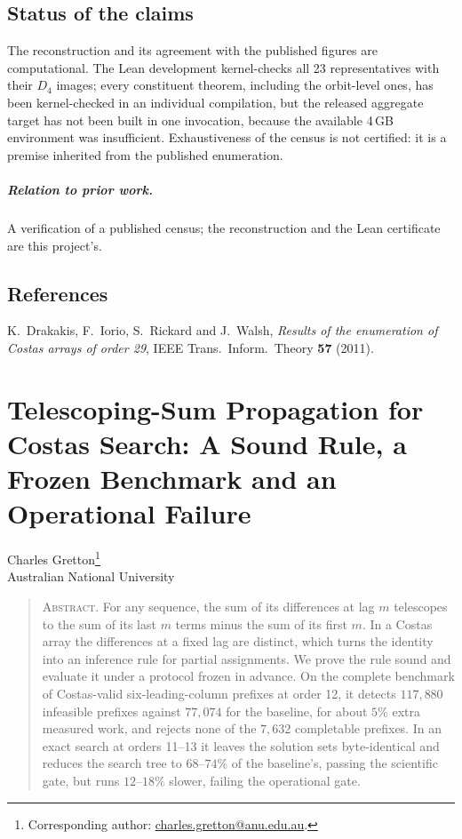\documentclass[11pt,a4paper,oneside]{report}
\makeatletter
\theoremstyle{definition}
\newcommand{\paperauthor}{\begin{center}\large Charles Gretton\footnote{Corresponding author: \href{mailto:charles.gretton@anu.edu.au}{charles.gretton@anu.edu.au}.}\\[2pt]\normalsize Australian National University\end{center}\vspace{0.5em}}
\newcommand{\paperabstract}[1]{\begin{quote}\small\noindent\textsc{Abstract.} #1\end{quote}\vspace{0.5em}}
\newenvironment{paperrefs}{\section*{References}\list{\@biblabel{\@arabic\c@enumiv}}{\settowidth\labelwidth{\@biblabel{99}}\leftmargin\labelwidth\advance\leftmargin\labelsep\usecounter{enumiv}\let\p@enumiv\@empty\renewcommand\theenumiv{\@arabic\c@enumiv}}\sloppy\small}{\endlist}
\makeatother
\begin{document}

\section{Status of the claims}\label{p4-sec:status}
The reconstruction and its agreement with the published figures are computational. The Lean
development kernel-checks all 23 representatives with their $D_4$ images; every constituent theorem, including the orbit-level ones, has been kernel-checked in an individual compilation, but the released aggregate target has not been built in one invocation, because the available 4\,GB environment was insufficient. Exhaustiveness of the census is not certified: it is a premise
inherited from the published enumeration.

\paragraph{Relation to prior work.} A verification of a published census; the reconstruction and the Lean certificate are this project's.
\begin{paperrefs}
 K.~Drakakis, F.~Iorio, S.~Rickard and J.~Walsh,
\emph{Results of the enumeration of Costas arrays of order 29}, IEEE Trans.\
Inform.\ Theory \textbf{57} (2011).
\end{paperrefs}

\clearpage
\chapter{Telescoping-Sum Propagation for Costas Search: A Sound Rule, a Frozen Benchmark and an Operational Failure}\label{p5-paper}
\paperauthor
\paperabstract{For any sequence, the sum of its differences at lag $m$ telescopes to the sum of its last $m$
terms minus the sum of its first $m$. In a Costas array the differences at a fixed lag are distinct,
which turns the identity into an inference rule for partial assignments. We prove the rule sound and
evaluate it under a protocol frozen in advance. On the complete benchmark of Costas-valid
six-leading-column prefixes at order 12, it detects $117{,}880$ infeasible prefixes against
$77{,}074$ for the baseline, for about $5\%$ extra measured work, and rejects none of the $7{,}632$
completable prefixes. In an exact search at orders 11--13 it leaves the solution sets byte-identical
and reduces the search tree to $68$--$74\%$ of the baseline's, passing the scientific gate, but runs
$12$--$18\%$ slower, failing the operational gate.}
\end{document}
